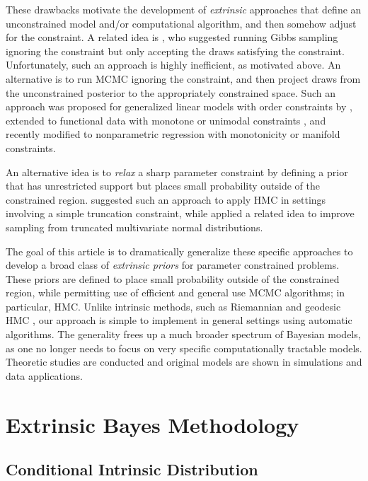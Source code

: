 \documentclass[10pt]{article}
\DeclareMathOperator{\1}{\mathbbm{1}}
\begin{document}
These drawbacks motivate the development of {\em extrinsic} approaches that define an unconstrained model and/or computational algorithm, and then somehow adjust for the constraint. A related idea is \cite{gelfand1992bayesian}, who suggested running Gibbs sampling ignoring the constraint but only accepting the draws satisfying the constraint. Unfortunately, such an approach is highly inefficient, as motivated above. An alternative is to run MCMC ignoring the constraint, and then project draws from the unconstrained posterior to the appropriately constrained space. Such an approach was proposed for generalized linear models with order constraints by \cite{dunson2003bayesian}, extended to functional data with monotone or unimodal constraints \cite{gunn2005transformation}, and recently modified to nonparametric regression with monotonicity \cite{lin2014monogp} or manifold \cite{lin2016extrinsic} constraints.

An alternative idea is to {\em relax} a sharp parameter constraint by defining a prior that has unrestricted support but places small probability outside of the constrained region. \cite{neal2011mcmc} suggested such an approach to apply HMC in settings involving a simple truncation constraint, while \cite{pakman2014exact} applied a related idea to improve sampling from truncated multivariate normal distributions.

The goal of this article is to dramatically generalize these specific approaches to develop a broad class of {\em extrinsic priors} for parameter constrained problems. These priors are defined to place small probability outside of the constrained region, while permitting use of efficient and general use MCMC algorithms; in particular, HMC. Unlike intrinsic methods, such as Riemannian and geodesic HMC \citep{girolami2011riemann,byrne2013geodesic}, our approach is simple to implement in general settings using automatic algorithms. The generality frees up a much broader spectrum of Bayesian models, as one no longer needs to focus on very specific computationally tractable models.
Theoretic studies are conducted and original models are shown in simulations and data applications.

\section{Extrinsic Bayes Methodology}

\subsection{Conditional Intrinsic Distribution}
\end{document}
